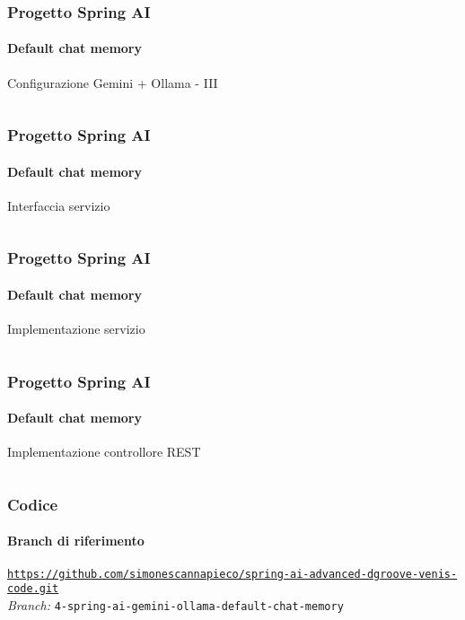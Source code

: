 %
\begin{frame}[t,fragile] \frametitle{Progetto Spring AI}
    \framesubtitle{Default chat memory}
        \vspace*{-.7cm}
        \begin{block}{Configurazione Gemini + Ollama - III}
			{\tiny\inputminted{java}{code/MemoryChatClientConfig-3.java}}
    	\end{block}
\end{frame}
%
\begin{frame}[t,fragile] \frametitle{Progetto Spring AI}
    \framesubtitle{Default chat memory}
        \begin{block}{Interfaccia servizio}
			{\tiny\inputminted{java}{code/QuestionService.java}}
    	\end{block}
\end{frame}
%
\begin{frame}[t,fragile] \frametitle{Progetto Spring AI}
    \framesubtitle{Default chat memory}
        \vspace*{-.7cm}
        \begin{block}{Implementazione servizio}
			{\tiny\inputminted{java}{code/QuestionServiceImpl.java}}
    	\end{block}
\end{frame}
%
\begin{frame}[t,fragile] \frametitle{Progetto Spring AI}
    \framesubtitle{Default chat memory}
    	\vspace*{-.7cm}
        \begin{block}{Implementazione controllore REST}
			{\tiny\inputminted{java}{code/QuestionController.java}}
    	\end{block}
\end{frame}
%
\begin{frame}[fragile] \frametitle{Codice}
    \framesubtitle{Branch di riferimento}
	\begin{center}
		{\scriptsize \href{https://github.com/simonescannapieco/spring-ai-advanced-dgroove-venis-code.git}{\texttt{https://github.com/simonescannapieco/spring-ai-advanced-dgroove-venis-code.git}}}\\
		\textit{Branch:} \alert{\texttt{4-spring-ai-gemini-ollama-default-chat-memory}}
	\end{center}
\end{frame}